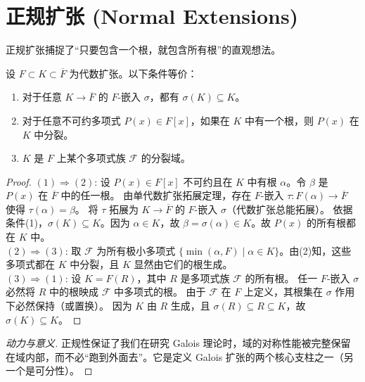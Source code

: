 \documentclass[11pt]{article}
\begin{document}
\section{正规扩张 (Normal Extensions)}

正规扩张捕捉了“只要包含一个根，就包含所有根”的直观想法。

\begin{cntheorem}[正规扩张的等价性]
    设 $F \subset K \subset \overline{F}$ 为代数扩张。以下条件等价：
    \begin{enumerate}
        \item 对于任意 $K \to \overline{F}$ 的 $F$-嵌入 $\sigma$，都有 $\sigma(K) \subseteq K$。
        \item 对于任意不可约多项式 $P(x) \in F[x]$，如果在 $K$ 中有一个根，则 $P(x)$ 在 $K$ 中分裂。
        \item $K$ 是 $F$ 上某个多项式族 $\mathcal{F}$ 的分裂域。
    \end{enumerate}
\end{cntheorem}

\begin{proof}
    $(1) \Rightarrow (2)$: 设 $P(x) \in F[x]$ 不可约且在 $K$ 中有根 $\alpha$。令 $\beta$ 是 $P(x)$ 在 $\overline{F}$ 中的任一根。
    由单代数扩张拓展定理，存在 $F$-嵌入 $\tau: F(\alpha) \to \overline{F}$ 使得 $\tau(\alpha) = \beta$。
    将 $\tau$ 拓展为 $K \to \overline{F}$ 的 $F$-嵌入 $\sigma$（代数扩张总能拓展）。
    依据条件(1)，$\sigma(K) \subseteq K$。因为 $\alpha \in K$，故 $\beta = \sigma(\alpha) \in K$。故 $P(x)$ 的所有根都在 $K$ 中。 \\
    $(2) \Rightarrow (3)$: 取 $\mathcal{F}$ 为所有极小多项式 $\{ \min(\alpha, F) \mid \alpha \in K \}$。由(2)知，这些多项式都在 $K$ 中分裂，且 $K$ 显然由它们的根生成。 \\
    $(3) \Rightarrow (1)$: 设 $K = F(R)$，其中 $R$ 是多项式族 $\mathcal{F}$ 的所有根。
    任一 $F$-嵌入 $\sigma$ 必然将 $R$ 中的根映成 $\mathcal{F}$ 中多项式的根。
    由于 $\mathcal{F}$ 在 $F$ 上定义，其根集在 $\sigma$ 作用下必然保持（或置换）。
    因为 $K$ 由 $R$ 生成，且 $\sigma(R) \subseteq R \subseteq K$，故 $\sigma(K) \subseteq K$。
\end{proof}

\begin{proof}[动力与意义]
    正规性保证了我们在研究 Galois 理论时，域的对称性能被完整保留在域内部，而不必“跑到外面去”。它是定义 Galois 扩张的两个核心支柱之一（另一个是可分性）。
\end{proof}
\end{document}
